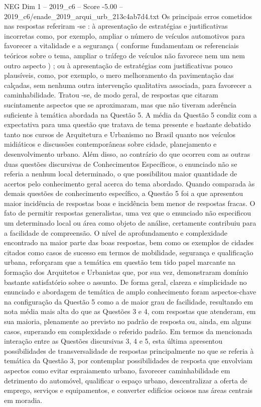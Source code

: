 \begin{textsample}{NEG Dim 1 – 2019\_c6 – Score -5.00 – 2019\_c6/enade\_2019\_arqui\_urb\_213c4ab7d4.txt}
Os principais erros cometidos nas respostas referiram -se : à apresentação de estratégias e justificativas incorretas como, por exemplo, ampliar o número de veículos automotivos para favorecer a vitalidade e a segurança ( conforme fundamentam os referenciais teóricos sobre o tema, ampliar o tráfego de veículos não favorece nem um nem outro aspecto ) ; ou à apresentação de estratégias com justificativas pouco plausíveis, como, por exemplo, o mero melhoramento da pavimentação das calçadas, sem nenhuma outra intervenção qualitativa associada, para favorecer a caminhabilidade.
Tratou -se, de modo geral, de respostas que citaram sucintamente aspectos que se aproximaram, mas que não tiveram aderência suficiente à temática abordada na Questão 5.
A média da Questão 5 condiz com a expectativa para uma questão que tratava de tema presente e bastante debatido tanto nos cursos de Arquitetura e Urbanismo no Brasil quanto nos veículos midiáticos e discussões contemporâneas sobre cidade, planejamento e desenvolvimento urbano.
Além disso, ao contrário do que ocorreu com as outras duas questões discursivas de Conhecimentos Específicos, o enunciado não se referia a nenhum local determinado, o que possibilitou maior quantidade de acertos pelo conhecimento geral acerca do tema abordado.
Quando comparada às demais questões de conhecimento específico, a Questão 5 foi a que apresentou maior incidência de respostas boas e incidência bem menor de respostas fracas.
O fato de permitir respostas generalistas, uma vez que o enunciado não especificou um determinado local ou área como objeto de análise, certamente contribuiu para a facilidade de compreensão.
O nível de aprofundamento e complexidade encontrado na maior parte das boas respostas, bem como os exemplos de cidades citados como casos de sucesso em termos de mobilidade, segurança e qualificação urbana, reforçaram que a temática em questão tem tido papel marcante na formação dos Arquitetos e Urbanistas que, por sua vez, demonstraram domínio bastante satisfatório sobre o assunto.
De forma geral, clareza e simplicidade no enunciado e abordagem de temática de amplo conhecimento foram aspectos-chave na configuração da Questão 5 como a de maior grau de facilidade, resultando em nota média mais alta do que as Questões 3 e 4, com respostas que atenderam, em sua maioria, plenamente ao previsto no padrão de resposta ou, ainda, em alguns casos, superando em complexidade o referido padrão.
Em termos da mencionada interação entre as Questões discursivas 3, 4 e 5, esta última apresentou possibilidades de transversalidade de respostas principalmente no que se referia à temática da Questão 3, por contemplar possibilidades de resposta que envolviam aspectos como evitar espraiamento urbano, favorecer caminhabilidade em detrimento do automóvel, qualificar o espaço urbano, descentralizar a oferta de emprego, serviços e equipamentos, e converter edifícios ociosos nas áreas centrais em moradia.

\end{textsample}
